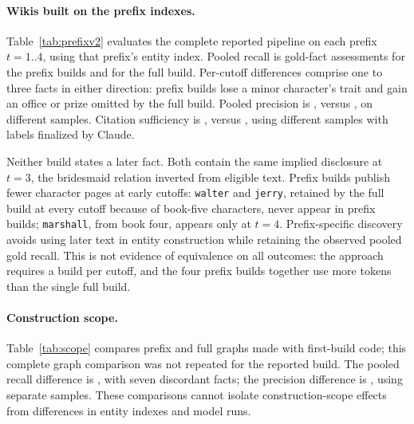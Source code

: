 \begin{table}[t]
\caption{The reported \sys built on entity indexes discovered from the prefix (\emph{prefix}: one build
per cutoff, every stage on volumes $1..t$) against the same cutoff of its five-volume build (\emph{full}).
Metrics as in Table~\ref{tab:full-results}; precision is on a different sample of 40 assertions in each
build. The prefix builds received a single LLM labeling pass; the full build's labels were
finalized by Claude Opus~5.5 (Appendix~\ref{app:annotation}). The full
build's tokens, for all five cutoffs at once, are in Table~\ref{tab:efficiency}.
Bold cyan cells mark the higher rate where the builds differ; bold pink cells mark non-zero
disclosure counts.}
\label{tab:prefixv2}
\end{table}

\paragraph{Wikis built on the prefix indexes.}
Table~\ref{tab:prefixv2} evaluates the complete reported pipeline on each prefix
$t=1..4$, using that prefix's entity index. Pooled recall is
 gold-fact assessments for the prefix builds and
 for the full build. Per-cutoff differences comprise one
to three facts in either direction: prefix builds lose a minor character's trait
and gain an office or prize omitted by the full build. Pooled precision is
, versus , on different samples.
Citation sufficiency is , versus
, using different samples with labels finalized by Claude.

Neither build states a later fact. Both contain the same implied disclosure at $t=3$,
the bridesmaid relation inverted from eligible text. Prefix builds publish fewer
character pages at early cutoffs: \texttt{walter} and \texttt{jerry}, retained by the
full build at every cutoff because of book-five characters, never appear in prefix
builds; \texttt{marshall}, from book four, appears only at $t=4$.
Prefix-specific discovery avoids using later text in entity construction while retaining
the observed pooled gold recall. This is not evidence of equivalence on all outcomes:
the approach requires a build per cutoff, and the four prefix builds together use more
tokens than the single full build.

\paragraph{Construction scope.}
Table~\ref{tab:scope} compares prefix and full graphs made with first-build code;
this complete graph comparison was not repeated for the reported build.
The pooled recall difference is , with seven discordant facts; the precision
difference is , using separate samples. These comparisons cannot isolate
construction-scope effects from differences in entity indexes and model runs.

